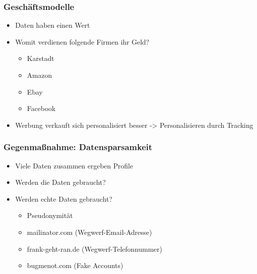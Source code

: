 \documentclass[12pt]{beamer}
\begin{document}
\begin{frame}
  \frametitle{Geschäftsmodelle}
  \begin{itemize}
    \item<2-> Daten haben einen Wert
    \item<3-> Womit verdienen folgende Firmen ihr Geld?
      \begin{itemize}
        \item<4-> Karstadt
        \item<5-> Amazon
        \item<6-> Ebay
        \item<7-> Facebook
      \end{itemize}
      \item<8-> Werbung verkauft sich personalisiert besser -> Personalisieren durch Tracking
  \end{itemize}
\end{frame}

\begin{frame}
  \frametitle{Gegenmaßnahme: Datensparsamkeit}
  \begin{itemize}
      \item<2-> Viele Daten zusammen ergeben Profile
      \item<3-> Werden die Daten gebraucht?
      \item<4-> Werden echte Daten gebraucht?
          \begin{itemize}
            \item<5-> Pseudonymität
            \item<6-> mailinator.com (Wegwerf-Email-Adresse)
            \item<7-> frank-geht-ran.de (Wegwerf-Telefonnummer)
            \item<8-> bugmenot.com (Fake Accounts)
          \end{itemize}
  \end{itemize}
\end{frame}
\end{document}
